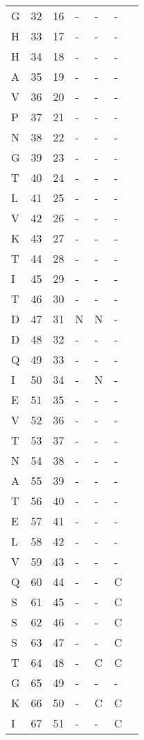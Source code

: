 \begin{longtable}{lllllll}
  G &  32 & 16 & - & - & - &  \\ 
  H &  33 & 17 & - & - & - &  \\ 
  H &  34 & 18 & - & - & - &  \\ 
  A &  35 & 19 & - & - & - &  \\ 
  V &  36 & 20 & - & - & - &  \\ 
  P &  37 & 21 & - & - & - &  \\ 
  N &  38 & 22 & - & - & - &  \\ 
  G &  39 & 23 & - & - & - &  \\ 
  T &  40 & 24 & - & - & - &  \\ 
  L &  41 & 25 & - & - & - &  \\ 
  V &  42 & 26 & - & - & - &  \\ 
  K &  43 & 27 & - & - & - &  \\ 
  T &  44 & 28 & - & - & - &  \\ 
  I &  45 & 29 & - & - & - &  \\ 
  T &  46 & 30 & - & - & - &  \\ 
  D &  47 & 31 & N & N & - &  \\ 
  D &  48 & 32 & - & - & - &  \\ 
  Q &  49 & 33 & - & - & - &  \\ 
  I &  50 & 34 & - & N & - &  \\ 
  E &  51 & 35 & - & - & - &  \\ 
  V &  52 & 36 & - & - & - &  \\ 
  T &  53 & 37 & - & - & - &  \\ 
  N &  54 & 38 & - & - & - &  \\ 
  A &  55 & 39 & - & - & - &  \\ 
  T &  56 & 40 & - & - & - &  \\ 
  E &  57 & 41 & - & - & - &  \\ 
  L &  58 & 42 & - & - & - &  \\ 
  V &  59 & 43 & - & - & - &  \\ 
  Q &  60 & 44 & - & - & C &  \\ 
  S &  61 & 45 & - & - & C &  \\ 
  S &  62 & 46 & - & - & C &  \\ 
  S &  63 & 47 & - & - & C &  \\ 
  T &  64 & 48 & - & C & C &  \\ 
  G &  65 & 49 & - & - & - &  \\ 
  K &  66 & 50 & - & C & C &  \\ 
  I &  67 & 51 & - & - & C &  \\ 

\end{longtable}
